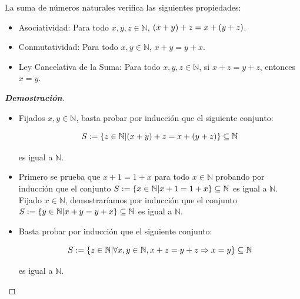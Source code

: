 \begin{proposition}
  \rm La suma de números naturales verifica las siguientes propiedades:

  \begin{itemize}
    \item[1.] Asociatividad: Para todo $x,y,z\in\mathbb{N}$, $\left(x+y\right)+z=x+\left(y+z\right)$.
    \item[2.] Conmutatividad: Para todo $x,y\in\mathbb{N}$, $x+y=y+x$.
    \item[3.] Ley Cancelativa de la Suma: Para todo $x,y,z\in\mathbb{N}$, si $x+z=y+z$, entonces $x=y$.
  \end{itemize}

  \begin{proof}[\rm\textbf{Demostración}]
    \hfill
    \begin{itemize}
      \item[1.] Fijados $x,y\in\mathbb{N}$, basta probar por inducción que el siguiente conjunto:
      
      \begin{equation}
        S:=\left\{z\in\mathbb{N}\middle|\left(x+y\right)+z=x+\left(y+z\right)\right\}\subseteq\mathbb{N}
      \end{equation}
      
      es igual a $\mathbb{N}$.
      \item[2.] Primero se prueba que $x+1=1+x$ para todo $x\in\mathbb{N}$ probando por inducción que el conjunto $S:=\left\{x\in\mathbb{N}\middle|x+1=1+x\right\}\subseteq\mathbb{N}$ es igual a $\mathbb{N}$. Fijado $x\in\mathbb{N}$, demostraríamos por inducción que el conjunto $S:=\left\{y\in\mathbb{N}\middle|x+y=y+x\right\}\subseteq\mathbb{N}$ es igual a $\mathbb{N}$.
      \item[3.] Basta probar por inducción que el siguiente conjunto:
      
      \begin{equation}
        S:=\left\{z\in\mathbb{N}\middle|\forall x,y\in\mathbb{N},x+z=y+z\Rightarrow x=y\right\}\subseteq\mathbb{N}
      \end{equation}

      es igual a $\mathbb{N}$.
    \end{itemize}
  \end{proof}
\end{proposition}

